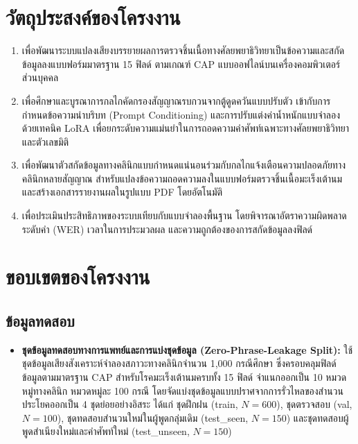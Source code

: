 \section{วัตถุประสงค์ของโครงงาน}
\begin{enumerate}
    \item เพื่อพัฒนาระบบแปลงเสียงบรรยายผลการตรวจชิ้นเนื้อทางศัลยพยาธิวิทยาเป็นข้อความและสกัดข้อมูลลงแบบฟอร์มมาตรฐาน 15 ฟิลด์ ตามเกณฑ์ CAP แบบออฟไลน์บนเครื่องคอมพิวเตอร์ส่วนบุคคล
    \item เพื่อศึกษาและบูรณาการกลไกคัดกรองสัญญาณรบกวนจากตู้ดูดควันแบบปรับตัว เข้ากับการกำหนดข้อความนำบริบท (Prompt Conditioning) และการปรับแต่งค่าน้ำหนักแบบจำลองด้วยเทคนิค LoRA เพื่อยกระดับความแม่นยำในการถอดความคำศัพท์เฉพาะทางศัลยพยาธิวิทยาและตัวเลขมิติ
    \item เพื่อพัฒนาตัวสกัดข้อมูลทางคลินิกแบบกำหนดแน่นอนร่วมกับกลไกแจ้งเตือนความปลอดภัยทางคลินิกหลายสัญญาณ สำหรับแปลงข้อความถอดความลงในแบบฟอร์มตรวจชิ้นเนื้อมะเร็งเต้านมและสร้างเอกสารรายงานผลในรูปแบบ PDF โดยอัตโนมัติ
    \item เพื่อประเมินประสิทธิภาพของระบบเทียบกับแบบจำลองพื้นฐาน โดยพิจารณาอัตราความผิดพลาดระดับคำ (WER) เวลาในการประมวลผล และความถูกต้องของการสกัดข้อมูลลงฟิลด์
\end{enumerate}

\section{ขอบเขตของโครงงาน}

\subsection{ข้อมูลทดสอบ}
\begin{itemize}
    \item \textbf{ชุดข้อมูลทดสอบทางการแพทย์และการแบ่งชุดข้อมูล (Zero-Phrase-Leakage Split):} ใช้ชุดข้อมูลเสียงสังเคราะห์จำลองสภาวะทางคลินิกจำนวน 1,000 กรณีศึกษา ซึ่งครอบคลุมฟิลด์ข้อมูลตามมาตรฐาน CAP สำหรับโรคมะเร็งเต้านมครบทั้ง 15 ฟิลด์ จำแนกออกเป็น 10 หมวดหมู่ทางคลินิก หมวดหมู่ละ 100 กรณี โดยจัดแบ่งชุดข้อมูลแบบปราศจากการรั่วไหลของสำนวนประโยคออกเป็น 4 ชุดย่อยอย่างอิสระ ได้แก่ ชุดฝึกฝน (train, $N = 600$), ชุดตรวจสอบ (val, $N = 100$), ชุดทดสอบสำนวนใหม่ในผู้พูดกลุ่มเดิม (test\_seen, $N = 150$) และชุดทดสอบผู้พูดสำเนียงใหม่และคำศัพท์ใหม่ (test\_unseen, $N = 150$)
\end{itemize}

